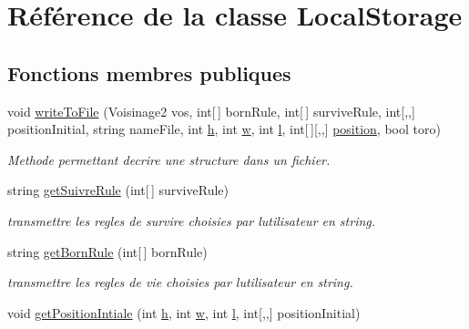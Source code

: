 \hypertarget{class_local_storage}{}\section{Référence de la classe Local\+Storage}
\label{class_local_storage}
\subsection*{Fonctions membres publiques}
\begin{DoxyCompactItemize}
\item 
void \mbox{\hyperlink{class_local_storage_ad926dd8fdacba87487812c2063aee8dc}{write\+To\+File}} (Voisinage2 vos, int\mbox{[}$\,$\mbox{]} born\+Rule, int\mbox{[}$\,$\mbox{]} survive\+Rule, int\mbox{[},,\mbox{]} position\+Initial, string name\+File, int \mbox{\hyperlink{class_local_storage_ab025e3ab66a812167b739de8f636e72f}{h}}, int \mbox{\hyperlink{class_local_storage_abac4c0cb7803f4f4438aba6a02a9eba2}{w}}, int \mbox{\hyperlink{class_local_storage_a37e93f37b061a398e9d3cbfaf4c7fecd}{l}}, int\mbox{[}$\,$\mbox{]}\mbox{[},,\mbox{]} \mbox{\hyperlink{class_local_storage_a135431eb0ae788b698b206b3cf12130d}{position}}, bool toro)
\begin{DoxyCompactList}\small\item\em Methode permettant d\textquotesingle{}ecrire une structure dans un fichier. \end{DoxyCompactList}\item 
string \mbox{\hyperlink{class_local_storage_a20e7dd1d1990599a38017e986944fada}{get\+Suivre\+Rule}} (int\mbox{[}$\,$\mbox{]} survive\+Rule)
\begin{DoxyCompactList}\small\item\em transmettre les regles de survire choisies par l\textquotesingle{}utilisateur en string. \end{DoxyCompactList}\item 
string \mbox{\hyperlink{class_local_storage_a64ead0288876a2aa3fbb7d86d3d68cc5}{get\+Born\+Rule}} (int\mbox{[}$\,$\mbox{]} born\+Rule)
\begin{DoxyCompactList}\small\item\em transmettre les regles de vie choisies par l\textquotesingle{}utilisateur en string. \end{DoxyCompactList}\item 
void \mbox{\hyperlink{class_local_storage_a734f343d76b672b65a1dd211dcdca087}{get\+Position\+Intiale}} (int \mbox{\hyperlink{class_local_storage_ab025e3ab66a812167b739de8f636e72f}{h}}, int \mbox{\hyperlink{class_local_storage_abac4c0cb7803f4f4438aba6a02a9eba2}{w}}, int \mbox{\hyperlink{class_local_storage_a37e93f37b061a398e9d3cbfaf4c7fecd}{l}}, int\mbox{[},,\mbox{]} position\+Initial)

\end{DoxyCompactItemize}
